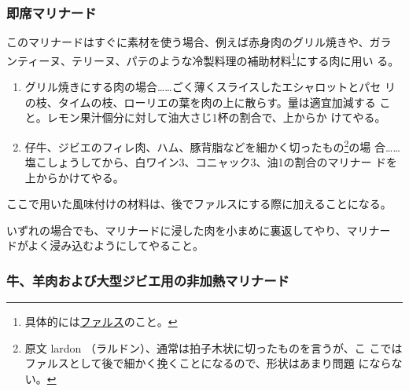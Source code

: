 \begin{recette}
\hypertarget{marinade-instantanee}{%
\subsubsection{即席マリナード}\label{marinade-instantanee}}



このマリナードはすぐに素材を使う場合、例えば赤身肉のグリル焼きや、ガラ
ンティーヌ、テリーヌ、パテのような冷製料理の補助材料\footnote{具体的には\protect\hyperlink{farces}{ファルス}のこと。}にする肉に用い
る。

\begin{enumerate}
\def\labelenumi{\arabic{enumi}.}
\item
  グリル焼きにする肉の場合\ldots{}\ldots{}ごく薄くスライスしたエシャロットとパセ
  リの枝、タイムの枝、ローリエの葉を肉の上に散らす。量は適宜加減する
  こと。レモン果汁\undemi{}個分に対して油大さじ1杯の割合で、上からか
  けてやる。
\item
  仔牛、ジビエのフィレ肉、ハム、豚背脂などを細かく切ったもの\footnote{原文
    lardon （ラルドン）、通常は拍子木状に切ったものを言うが、こ
    こではファルスとして後で細かく挽くことになるので、形状はあまり問題
    にならない。}の場
  合\ldots{}\ldots{}塩こしょうしてから、白ワイン3、コニャック3、油1の割合のマリナー
  ドを上からかけてやる。
\end{enumerate}

ここで用いた風味付けの材料は、後でファルスにする際に加えることになる。

いずれの場合でも、マリナードに浸した肉を小まめに裏返してやり、マリナー
ドがよく浸み込むようにしてやること。

\hypertarget{marinade-crue-pour-viandes-de-boucherie-ou-venaison}{%
\subsubsection{牛、羊肉および大型ジビエ用の非加熱マリナード}\label{marinade-crue-pour-viandes-de-boucherie-ou-venaison}}




\end{recette}

